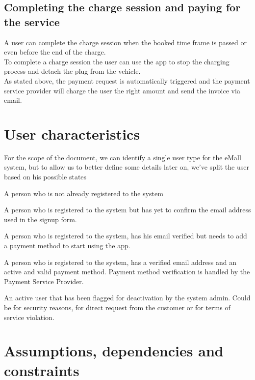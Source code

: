 \subsection{Completing the charge session and paying for the service}
A user can complete the charge session when the booked time frame is passed or even before the end of the charge.\\
To complete a charge session the user can use the app to stop the charging process and detach the plug from the vehicle.\\
As stated above, the payment request is automatically triggered and the payment service provider will charge the user the right amount and send the invoice via email.

\section{User characteristics}
For the scope of the document, we can identify a single user type for the eMall system, but to allow us to better define some details later on, we've split the user based on his possible states

\begin{enumerate}
	A person who is not already registered to the system
	
	A person who is registered to the system but has yet to confirm the email address used in the signup form.
	
	A person who is registered to the system, has his email verified but needs to add a payment method to start using the app.

	A person who is registered to the system, has a verified email address and an active and valid payment method. Payment method verification is handled by the Payment Service Provider.
	
	An active user that has been flagged for deactivation by the system admin. Could be for security reasons, for direct request from the customer or for terms of service violation.

\end{enumerate}

\section{Assumptions, dependencies and constraints}

